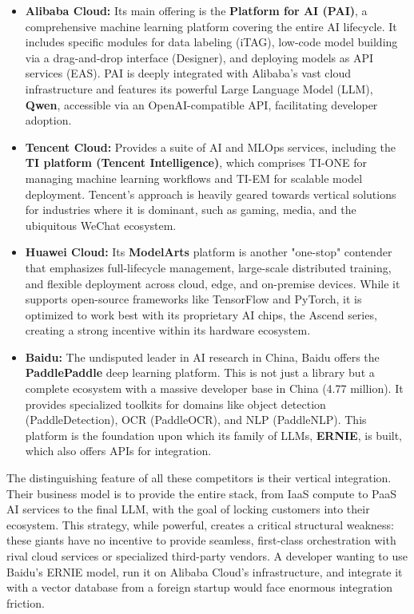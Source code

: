 \documentclass[11pt, a4paper, oneside]{article}
\begin{document}
\begin{itemize}
    \item \textbf{Alibaba Cloud:} Its main offering is the \textbf{Platform for AI (PAI)}, a comprehensive machine learning platform covering the entire AI lifecycle. It includes specific modules for data labeling (iTAG), low-code model building via a drag-and-drop interface (Designer), and deploying models as API services (EAS)\cite{AlibabaPAI}. PAI is deeply integrated with Alibaba's vast cloud infrastructure\cite{AlibabaCloudInfra, AlibabaCloudInfra2} and features its powerful Large Language Model (LLM), \textbf{Qwen}, accessible via an OpenAI-compatible API, facilitating developer adoption\cite{AlibabaQwen, QwenOpenAIAPI}.
    \item \textbf{Tencent Cloud:} Provides a suite of AI and MLOps services, including the \textbf{TI platform (Tencent Intelligence)}, which comprises TI-ONE for managing machine learning workflows and TI-EM for scalable model deployment\cite{TencentTI}. Tencent's approach is heavily geared towards vertical solutions for industries where it is dominant, such as gaming, media, and the ubiquitous WeChat ecosystem\cite{TencentEcosystem, TencentEcosystem2}.
    \item \textbf{Huawei Cloud:} Its \textbf{ModelArts} platform is another "one-stop" contender that emphasizes full-lifecycle management, large-scale distributed training, and flexible deployment across cloud, edge, and on-premise devices\cite{HuaweiModelArts, HuaweiModelArts2}. While it supports open-source frameworks like TensorFlow and PyTorch, it is optimized to work best with its proprietary AI chips, the Ascend series, creating a strong incentive within its hardware ecosystem\cite{HuaweiModelArts3, HuaweiModelArts4}.
    \item \textbf{Baidu:} The undisputed leader in AI research in China, Baidu offers the \textbf{PaddlePaddle} deep learning platform. This is not just a library but a complete ecosystem with a massive developer base in China (4.77 million)\cite{PaddlePaddleDevs}. It provides specialized toolkits for domains like object detection (PaddleDetection), OCR (PaddleOCR), and NLP (PaddleNLP)\cite{PaddlePaddleToolkits, PaddlePaddleEcosystem}. This platform is the foundation upon which its family of LLMs, \textbf{ERNIE}, is built, which also offers APIs for integration\cite{BaiduERNIE, BaiduERNIE2}.
\end{itemize}

The distinguishing feature of all these competitors is their vertical integration. Their business model is to provide the entire stack, from IaaS compute to PaaS AI services to the final LLM, with the goal of locking customers into their ecosystem. This strategy, while powerful, creates a critical structural weakness: these giants have no incentive to provide seamless, first-class orchestration with rival cloud services or specialized third-party vendors. A developer wanting to use Baidu's ERNIE model, run it on Alibaba Cloud's infrastructure, and integrate it with a vector database from a foreign startup would face enormous integration friction.
\end{document}
